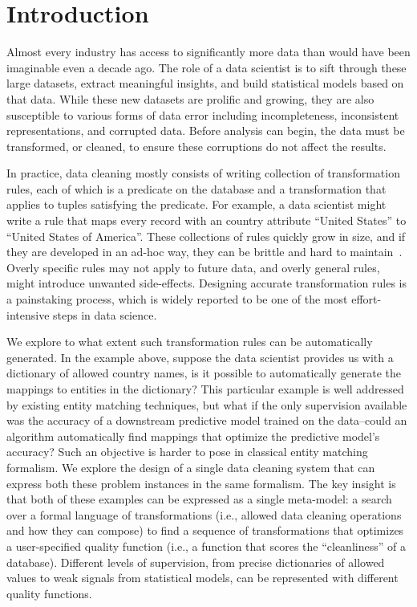 \section{Introduction}\label{intro}\sloppy
Almost every industry has access to significantly more data than would have been imaginable even a decade ago.
The role of a data scientist is to sift through these large datasets, extract meaningful insights, and build statistical models based on that data.
While these new datasets are prolific and growing, they are also susceptible to various forms of data error including incompleteness, inconsistent representations, and corrupted data.
Before analysis can begin, the data must be transformed, or cleaned, to ensure these corruptions do not affect the results.

In practice, data cleaning mostly consists of writing collection of transformation rules, each of which is a predicate on the database and a transformation that applies to tuples satisfying the predicate.
For example, a data scientist might write a rule that maps every record with an \textsf{country} attribute ``United States'' to ``United States of America''.
These collections of rules quickly grow in size, and if they are developed in an ad-hoc way, they can be brittle and hard to maintain~\cite{krishnan2016hilda}.
Overly specific rules may not apply to future data, and overly general rules, might introduce unwanted side-effects.
Designing accurate transformation rules is a painstaking process, which is widely reported to be one of the most effort-intensive steps in data science.

We explore to what extent such transformation rules can be automatically generated.
In the example above, suppose the data scientist provides us with a dictionary of allowed country names, is it possible to automatically generate the mappings to entities in the dictionary?
This particular example is well addressed by existing entity matching techniques, but what if the only supervision available was the accuracy of a downstream predictive model trained on the data--could an algorithm automatically find mappings that optimize the predictive model's accuracy?
Such an objective is harder to pose in classical entity matching formalism.
We explore the design of a single data cleaning system that can express both these problem instances in the same formalism.
The key insight is that both of these examples can be expressed as a single meta-model:  a search over a formal language of transformations (i.e., allowed data cleaning operations and how they can compose) to find a sequence of transformations that optimizes a user-specified quality function (i.e., a function that scores the ``cleanliness'' of a database).
Different levels of supervision, from precise dictionaries of allowed values to weak signals from statistical models, can be represented with different quality functions.

